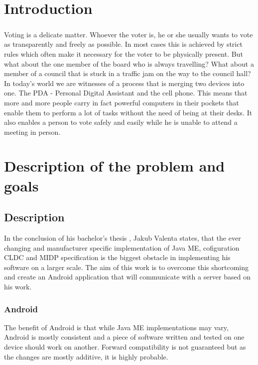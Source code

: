 \documentclass[11pt,twoside,a4paper]{book}
\begin{document}
\chapter{Introduction}

\paragraph*{}
Voting is a delicate matter. Whoever the voter is, he or she usually wants to vote as transparently and freely as possible. In most cases this is achieved by strict rules which often make it necessary for the voter to be physically present. But what about the one member of the board who is always travelling? What about a member of a council that is stuck in a traffic jam on the way to the council hall? \\
In today's world we are witnesses of a process that is merging two devices into one. The PDA - Personal Digital Assistant and the cell phone. This means that more and more people carry in fact powerful computers in their pockets that enable them to perform a lot of tasks without the need of being at their desks. It also enables a person to vote safely and easily while he is unable to attend a meeting in person. 

\chapter{Description of the problem and goals}

\section{Description}
In the conclusion of his bachelor's thesis , Jakub Valenta \cite{bakalarkaJV} states, that the ever changing and manufacturer specific implementation of Java ME, cofiguration CLDC and MIDP specification is the biggest obstacle in implementing his software on a larger scale.  The aim of this work is to overcome this shortcoming and create an Android application that will communicate with a server based on his work. 


\subsection{Android} 
The benefit of Android\cite{whatisAnd} is that while Java ME implementations may vary, Android is mostly consistent and a piece of software written and tested on one device should work on another. Forward compatibility is not guaranteed but as the changes are mostly additive, it is highly probable. \cite{goodevpi}
\end{document}
